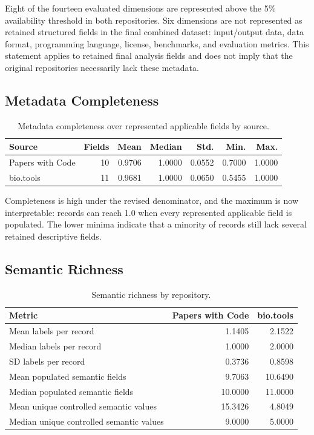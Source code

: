 \documentclass[pdflatex,sn-mathphys-num]{sn-jnl}
\theoremstyle{thmstyleone}%
\theoremstyle{thmstyletwo}%
\theoremstyle{thmstylethree}%
\begin{document}
Eight of the fourteen evaluated dimensions are represented above the 5\% availability threshold in both repositories. Six dimensions are not represented as retained structured fields in the final combined dataset: input/output data, data format, programming language, license, benchmarks, and evaluation metrics. This statement applies to retained final analysis fields and does not imply that the original repositories necessarily lack these metadata.

\subsection{Metadata Completeness}
\label{subsec:semantic-completeness}

\begin{table}[htbp]
\centering
\small
\caption{Metadata completeness over represented applicable fields by source.}
\label{tab:semantic-completeness-descriptive-statistics}
\begin{tabular}{lrrrrrr}
\toprule
Source & Fields & Mean & Median & Std. & Min. & Max. \\
\midrule
Papers with Code & 10 & 0.9706 & 1.0000 & 0.0552 & 0.7000 & 1.0000 \\
bio.tools & 11 & 0.9681 & 1.0000 & 0.0650 & 0.5455 & 1.0000 \\
\bottomrule
\end{tabular}
\end{table}

Completeness is high under the revised denominator, and the maximum is now interpretable: records can reach 1.0 when every represented applicable field is populated. The lower minima indicate that a minority of records still lack several retained descriptive fields.

\subsection{Semantic Richness}
\label{subsec:semantic-richness}

\begin{table}[htbp]
\centering
\small
\caption{Semantic richness by repository.}
\label{tab:semantic-richness-descriptive-statistics}
\begin{tabular}{lrr}
\toprule
Metric & Papers with Code & bio.tools \\
\midrule
Mean labels per record & 1.1405 & 2.1522 \\
Median labels per record & 1.0000 & 2.0000 \\
SD labels per record & 0.3736 & 0.8598 \\
Mean populated semantic fields & 9.7063 & 10.6490 \\
Median populated semantic fields & 10.0000 & 11.0000 \\
Mean unique controlled semantic values & 15.3426 & 4.8049 \\
Median unique controlled semantic values & 9.0000 & 5.0000 \\
\bottomrule
\end{tabular}
\end{table}
\end{document}
